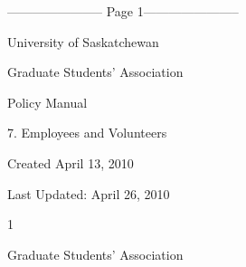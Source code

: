 ﻿----------------------- Page 1-----------------------

  



  



                                         University of Saskatchewan  



                                       Graduate  Students’ Association  



  



  



  



  



                                                                                             

  



  



                                                     Policy Manual  



                                        7. Employees and Volunteers  



  



  



  



  



  



  



Created April  13, 2010  



Last Updated: April 26, 2010 

                                   

                                   

                                                                 1  

                                           Graduate   Students’  Association  

